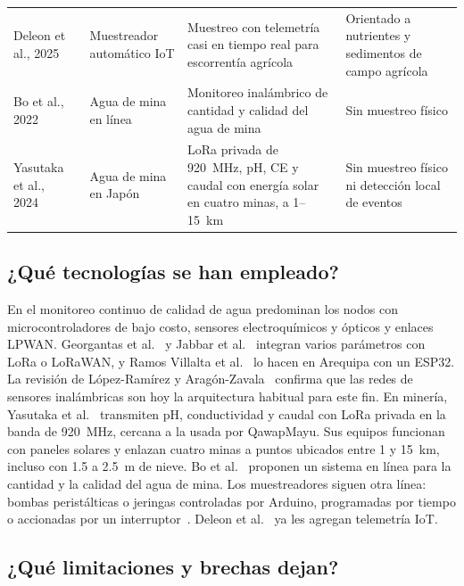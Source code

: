 {\begin{longtable}{p{2.6cm} p{3.1cm} p{4.9cm} p{4.6cm}}
Deleon et al., 2025~\cite{deleon2025} & Muestreador automático IoT & Muestreo con telemetría casi en tiempo real para escorrentía agrícola & Orientado a nutrientes y sedimentos de campo agrícola \\
Bo et al., 2022~\cite{bo2022} & Agua de mina en línea & Monitoreo inalámbrico de cantidad y calidad del agua de mina & Sin muestreo físico \\
Yasutaka et al., 2024~\cite{yasutaka2024} & Agua de mina en Japón & LoRa privada de 920~MHz, pH, CE y caudal con energía solar en cuatro minas, a 1--15~km & Sin muestreo físico ni detección local de eventos \\
\bottomrule
\end{longtable}
}

\subsection{¿Qué tecnologías se han empleado?}

En el monitoreo continuo de calidad de agua predominan los nodos con microcontroladores de bajo costo, sensores electroquímicos y ópticos y enlaces LPWAN. Georgantas et al.~\cite{georgantas} y Jabbar et al.~\cite{jabbar} integran varios parámetros con LoRa o LoRaWAN, y Ramos Villalta et al.~\cite{ramos} lo hacen en Arequipa con un ESP32. La revisión de López-Ramírez y Aragón-Zavala~\cite{lopez2023} confirma que las redes de sensores inalámbricas son hoy la arquitectura habitual para este fin. En minería, Yasutaka et al.~\cite{yasutaka2024} transmiten pH, conductividad y caudal con LoRa privada en la banda de 920~MHz, cercana a la usada por QawapMayu. Sus equipos funcionan con paneles solares y enlazan cuatro minas a puntos ubicados entre 1 y 15~km, incluso con 1.5 a 2.5~m de nieve. Bo et al.~\cite{bo2022} proponen un sistema en línea para la cantidad y la calidad del agua de mina. Los muestreadores siguen otra línea: bombas peristálticas o jeringas controladas por Arduino, programadas por tiempo o accionadas por un interruptor~\cite{khamis2023,neumann2023}. Deleon et al.~\cite{deleon2025} ya les agregan telemetría IoT.

\subsection{¿Qué limitaciones y brechas dejan?}


